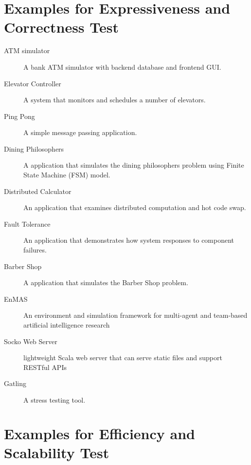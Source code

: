\section{Examples for Expressiveness and Correctness Test}
\label{app_correct}

\begin{description}
  \item[ATM simulator\cite{quviq} ] A bank ATM simulator with backend database
and frontend GUI.
  \item[Elevator Controller \cite{quviq}] A system that monitors and schedules a
number of elevators. 
  \item[Ping Pong \cite{akka_doc} ] A simple message passing application.
  \item[Dining Philosophers \cite{akka_doc}] A application that simulates the
dining philosophers problem using Finite State Machine (FSM) model.
  \item[Distributed Calculator \cite{akka_doc}] An application that examines
distributed computation and hot code swap.
  \item[Fault Tolerance \cite{akka_doc}] An application that demonstrates how
system responses to component failures.
  \item[Barber Shop\cite{BarberShop} ] A application that simulates the Barber
Shop problem. 
  \item[EnMAS \cite{EnMAS}] An environment and simulation framework for
multi-agent and team-based artificial intelligence research

  \item[Socko Web Server \cite{SOCKO} ]  lightweight Scala web server that can
serve static files and support RESTful APIs
  \item[Gatling \cite{Gatling}] A stress testing tool.
\end{description}


\section{Examples for Efficiency and Scalability Test}

